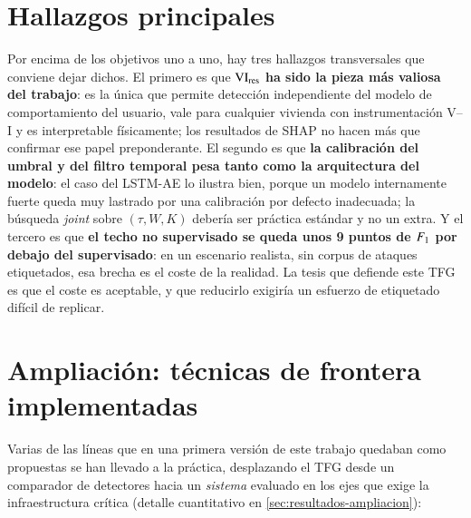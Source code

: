 \section{Hallazgos principales}

Por encima de los objetivos uno a uno, hay tres hallazgos transversales que conviene dejar dichos. El primero es que \textbf{$\mathrm{VI}_{\text{res}}$ ha sido la pieza más valiosa del trabajo}: es la única que permite detección independiente del modelo de comportamiento del usuario, vale para cualquier vivienda con instrumentación V--I y es interpretable físicamente; los resultados de SHAP no hacen más que confirmar ese papel preponderante. El segundo es que \textbf{la calibración del umbral y del filtro temporal pesa tanto como la arquitectura del modelo}: el caso del LSTM-AE lo ilustra bien, porque un modelo internamente fuerte queda muy lastrado por una calibración por defecto inadecuada; la búsqueda \textit{joint} sobre $(\tau, W, K)$ debería ser práctica estándar y no un extra. Y el tercero es que \textbf{el techo no supervisado se queda unos 9 puntos de $F_{1}$ por debajo del supervisado}: en un escenario realista, sin corpus de ataques etiquetados, esa brecha es el coste de la realidad. La tesis que defiende este TFG es que el coste es aceptable, y que reducirlo exigiría un esfuerzo de etiquetado difícil de replicar.

\section{Ampliación: técnicas de frontera implementadas}
\label{sec:ampliacion-conclusiones}

Varias de las líneas que en una primera versión de este trabajo quedaban como propuestas se han llevado a la práctica, desplazando el TFG desde un comparador de detectores hacia un \emph{sistema} evaluado en los ejes que exige la infraestructura crítica (detalle cuantitativo en \cref{sec:resultados-ampliacion}):

